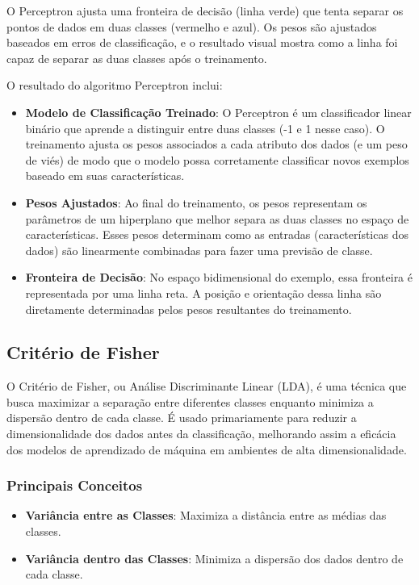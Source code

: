 \documentclass[
  a4paperpaper,
]{article}
\providecommand{\tightlist}{%
  \setlength{\itemsep}{0pt}\setlength{\parskip}{0pt}}\usepackage{longtable,booktabs,array}
\begin{document}
O Perceptron ajusta uma fronteira de decisão (linha verde) que tenta
separar os pontos de dados em duas classes (vermelho e azul). Os pesos
são ajustados baseados em erros de classificação, e o resultado visual
mostra como a linha foi capaz de separar as duas classes após o
treinamento.

O resultado do algoritmo Perceptron inclui:

\begin{itemize}
\tightlist
\item
  \textbf{Modelo de Classificação Treinado}: O Perceptron é um
  classificador linear binário que aprende a distinguir entre duas
  classes (-1 e 1 nesse caso). O treinamento ajusta os pesos associados
  a cada atributo dos dados (e um peso de viés) de modo que o modelo
  possa corretamente classificar novos exemplos baseado em suas
  características.
\item
  \textbf{Pesos Ajustados}: Ao final do treinamento, os pesos
  representam os parâmetros de um hiperplano que melhor separa as duas
  classes no espaço de características. Esses pesos determinam como as
  entradas (características dos dados) são linearmente combinadas para
  fazer uma previsão de classe.
\item
  \textbf{Fronteira de Decisão}: No espaço bidimensional do exemplo,
  essa fronteira é representada por uma linha reta. A posição e
  orientação dessa linha são diretamente determinadas pelos pesos
  resultantes do treinamento.
\end{itemize}

\subsection{Critério de Fisher}\label{crituxe9rio-de-fisher}

O Critério de Fisher, ou Análise Discriminante Linear (LDA), é uma
técnica que busca maximizar a separação entre diferentes classes
enquanto minimiza a dispersão dentro de cada classe. É usado
primariamente para reduzir a dimensionalidade dos dados antes da
classificação, melhorando assim a eficácia dos modelos de aprendizado de
máquina em ambientes de alta dimensionalidade.

\subsubsection{Principais Conceitos}\label{principais-conceitos-1}

\begin{itemize}
\tightlist
\item
  \textbf{Variância entre as Classes}: Maximiza a distância entre as
  médias das classes.
\item
  \textbf{Variância dentro das Classes}: Minimiza a dispersão dos dados
  dentro de cada classe.
\end{itemize}
\end{document}
